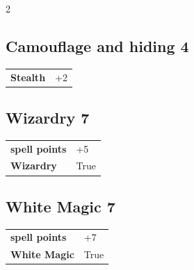 \begin{multicols}{2}
\begin{tcolorbox}
    \subsection*{Camouflage and hiding \hfill \small{4 }}
    \tcblower




\begin{tabular}{@{}ll@{}}
    \textbf{Stealth} & +2\\
\end{tabular}


\end{tcolorbox}

\begin{tcolorbox}
    \subsection*{Wizardry \hfill \small{7 }}
    \tcblower




\begin{tabular}{@{}ll@{}}
    \textbf{spell points} & +5\\
    \textbf{Wizardry} & True\\
\end{tabular}


\end{tcolorbox}

\begin{tcolorbox}
    \subsection*{White Magic \hfill \small{7 }}
    \tcblower




\begin{tabular}{@{}ll@{}}
    \textbf{spell points} & +7\\
    \textbf{White Magic} & True\\
\end{tabular}



\end{tcolorbox}
\end{multicols}
